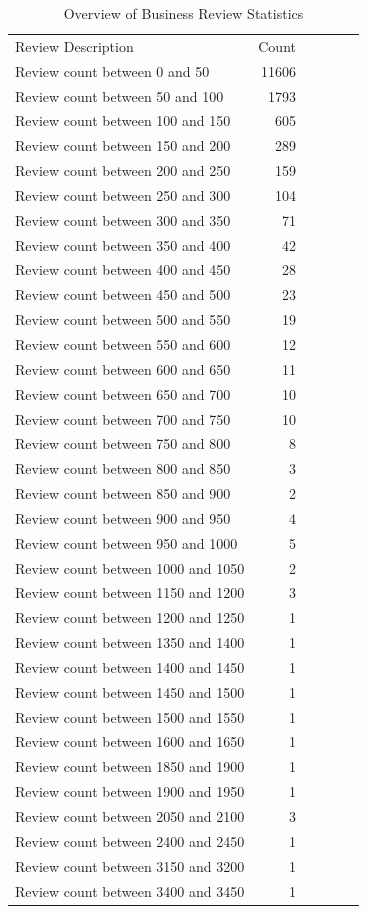 \documentclass{stylefiles/capstone}
\begin{document}
\begin{table}[h!]
\centering
\begin{tabular}{l r r r r r} 
 \hline
 Review Description & Count \\ [0.5ex] 
 Review count between 0 and 50 &	11606  \\
Review count between 50 and 100	& 1793  \\
Review count between 100 and 150 &	605 \\
Review count between 150 and 200 & 	289 \\
Review count between 200 and 250 & 	159 \\
Review count between 250 and 300 & 	104 \\
Review count between 300 and 350 & 	71 \\
Review count between 350 and 400 & 	42 \\
Review count between 400 and 450 & 	28 \\
Review count between 450 and 500 & 	23 \\
Review count between 500 and 550 & 	19 \\
Review count between 550 and 600 & 	12 \\
Review count between 600 and 650 & 	11 \\
Review count between 650 and 700 & 	10  \\
Review count between 700 and 750 & 	10 \\
Review count between 750 and 800 & 	8 \\
Review count between 800 and 850 & 	3 \\
Review count between 850 and 900 & 	2 \\
Review count between 900 and 950 & 	4 \\
Review count between 950 and 1000 &  5  \\
Review count between 1000 and 1050 & 	2  \\
Review count between 1150 and 1200 & 	3 \\
Review count between 1200 and 1250 & 	1 \\
Review count between 1350 and 1400 & 	1 \\
Review count between 1400 and 1450 & 	1 \\
Review count between 1450 and 1500 & 	1 \\
Review count between 1500 and 1550 & 	1 \\
Review count between 1600 and 1650 & 	1 \\
Review count between 1850 and 1900 & 	1 \\
Review count between 1900 and 1950 & 	1 \\
Review count between 2050 and 2100 & 	3 \\
Review count between 2400 and 2450 & 	1 \\
Review count between 3150 and 3200 & 	1 \\
Review count between 3400 and 3450 & 	1 \\
 [1ex] 
 \hline
\end{tabular}
\caption{Overview of Business Review Statistics}
\label{business_review_count_analysis}
\end{table}
\end{document}
